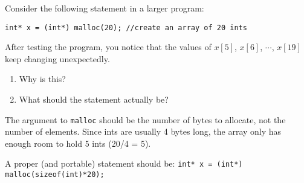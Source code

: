 Consider the following statement in a larger program:

\begin{lstlisting}[numbers=none]
int* x = (int*) malloc(20); //create an array of 20 ints
\end{lstlisting}

After testing the program, you notice that the values of $x[5]$, $x[6]$, $\cdots$, $x[19]$ keep changing unexpectedly.
\begin{enumerate}
\item
Why is this?

\item
What should the statement actually be?

\end{enumerate}

\begin{answer}
The argument to \texttt{malloc} should be the number of bytes to allocate, not the number of elements.
Since ints are usually 4 bytes long, the array only has enough room to hold 5 ints (20/4 = 5).

A proper (and portable) statement should be:
\texttt{int* x = (int*) malloc(sizeof(int)*20);}
\end{answer}
\newpage
